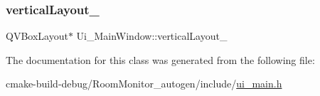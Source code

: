 \subsubsection{\texorpdfstring{vertical\+Layout\+\_}{verticalLayout\_9}}
{\footnotesize\ttfamily Q\+V\+Box\+Layout$\ast$ Ui\+\_\+\+Main\+Window\+::vertical\+Layout\+\_}



The documentation for this class was generated from the following file\+:\begin{DoxyCompactItemize}
\item 
cmake-\/build-\/debug/\+Room\+Monitor\+\_\+autogen/include/\hyperlink{ui__main_8h}{ui\+\_\+main.\+h}\end{DoxyCompactItemize}

